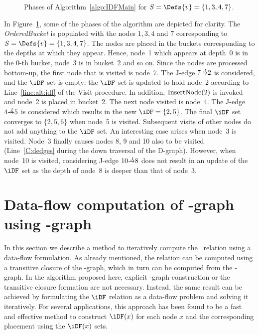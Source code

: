 {\begin{figure}[htb]
    \centerline{}
    \caption{Phases of Algorithm~\ref{algo:IDFMain} for $S=\Defs{v}=\{1,3,4,7\}$.}
    \label{fig:sreedhargao}
    \end{figure} 


In Figure~\ref{fig:sreedhargao}, some of the phases of the algorithm are depicted for clarity. 
The \textit{OrderedBucket} is populated with the nodes $1,3,4$ and $7$ corresponding to $S=\Defs{v}=\{1,3,4,7\}$. 
The nodes are placed in the buckets corresponding to the depths at which they appear. 
Hence, node~1 which appears at depth~0 is in the 0-th bucket, node~3 is in bucket~2 and so on. 
Since the nodes are processed bottom-up, the first node that is visited is node~7. 
The J-edge $7 \st{J} 2$ is considered, and the $\iDF$ set is empty: the $\iDF$ 
set is updated to hold node~2 according to Line~\ref{line:alt:idf} of the Visit 
procedure.  In addition, $\textrm{InsertNode}(2)$ is invoked and node~2 is placed in 
bucket~2.  The next node visited is node~4.  The J-edge $4 \st{J} 5$ is 
considered which results in the new $\iDF = \{2,5\}$.  The final $\iDF$ set 
converges to $\{2,5,6\}$ when node~5 is visited.  Subsequent visits of other 
nodes do not add anything to the $\iDF$ set.  An interesting case arises when 
node~3 is visited.  Node~3 finally causes nodes 8, 9 and 10 also to be visited 
(Line~\ref{C:dedges} during the down traversal of the D-graph).  However, when 
node~10 is visited, considering J-edge $10 \st{J} 8$ does not result in an 
update of the $\iDF$ set as the depth of node~8 is deeper than that of node~3.


\section{Data-flow computation of \iDF-graph using \DJ-graph}

In this section we describe a method to iteratively compute the \iDF~relation using a data-flow formulation. 
As already mentioned, the \iDF relation can be computed using a transitive closure of the \DF-graph, which in turn can be computed from the \DJ-graph. 
In the algorithm proposed here, explicit \DF-graph construction or the transitive closure formation are not necessary. 
Instead, the same result can be achieved by formulating the $\iDF$ relation as a data-flow problem and solving it iteratively. 
For several applications, this approach has been found to be a fast and effective method to construct $\iDF(x)$ for each node $x$ and the corresponding \phifun placement using the $\iDF(x)$ sets.

}
